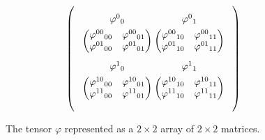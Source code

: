 \documentclass[
    aps,
    pra,
    reprint,
    superscriptaddress,
    nofootinbib
]{revtex4-2}
\theoremstyle{definition}
\theoremstyle{plain}
\begin{document}
\begin{figure}[ht]
    \centering

\[ \begin{pmatrix}
    \begin{tikzpicture}[
        block/.style={
            align=center,
            inner sep=8pt
        }
    ]
    
    \node[block] (A) at (0,1.8) {
        $\varphi^{0}{}_{0}$\\[2mm]
        $\begin{pmatrix}
            \varphi^{00}{}_{00} & \varphi^{00}{}_{01}\\
            \varphi^{01}{}_{00} & \varphi^{01}{}_{01}
        \end{pmatrix}$
    };
    
    \node[block] (B) at (2.6,1.8) {
        $\varphi^{0}{}_{1}$\\[2mm]
        $\begin{pmatrix}
            \varphi^{00}{}_{10} & \varphi^{00}{}_{11}\\
            \varphi^{01}{}_{10} & \varphi^{01}{}_{11}
        \end{pmatrix}$
    };
    
    \node[block] (C) at (0,0.1) {
        $\varphi^{1}{}_{0}$\\[2mm]
        $\begin{pmatrix}
            \varphi^{10}{}_{00} & \varphi^{10}{}_{01}\\
            \varphi^{11}{}_{00} & \varphi^{11}{}_{01}
        \end{pmatrix}$
    };
    
    \node[block] (D) at (2.6,0.1) {
        $\varphi^{1}{}_{1}$\\[2mm]
        $\begin{pmatrix}
            \varphi^{10}{}_{10} & \varphi^{10}{}_{11}\\
            \varphi^{11}{}_{10} & \varphi^{11}{}_{11}
        \end{pmatrix}$
    };


    \end{tikzpicture}
\end{pmatrix}
\]
    
\caption{The tensor $\varphi$ represented as a $2\times2$ array
of $2\times2$ matrices.}    \label{fig:rank-four-tensor}

\end{figure} 
\end{document}
